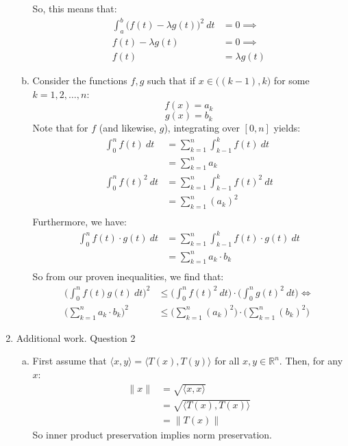 \documentclass[letterpaper,10pt]{article}
\begin{document}
\begin{enumerate}
\begin{enumerate}[a)]
		So, this means that:
		\begin{align*}
		  \int_{a}^{b} \big( f(t) - \lambda g(t) \big)^2 \ dt &= 0 \implies \\
		  f(t) - \lambda g(t) &= 0 \implies \\
		  f(t) &= \lambda g(t)
		\end{align*}
		\item Consider the functions $f, g$ such that if $x \in \big((k-1), k \big)$ for some $k = 1 , 2 , \dots , n$:
		$$f(x) = a_k$$
		$$g(x) = b_k$$
		Note that for $f$ (and likewise, $g$), integrating over $[0, n]$ yields:
		\begin{align*}
		  \int_{0}^{n} f(t) \ dt &= \sum_{k=1}^{n} \int_{k-1}^{k} f(t)\ dt \\
		  &= \sum_{k=1}^{n} a_k \\
		  \int_{0}^{n} f(t)^2 \ dt &= \sum_{k=1}^{n} \int_{k-1}^{k} f(t)^2\ dt \\
		  &= \sum_{k=1}^{n} (a_k)^2 \\
		\end{align*}
		Furthermore, we have:
		\begin{align*}
		  \int_{0}^{n} f(t)\cdot g(t) \ dt &= \sum_{k=1}^{n} \int_{k-1}^{k} f(t) \cdot g(t)\ dt \\
		  &= \sum_{k=1}^{n} a_k \cdot b_k\\
		\end{align*}
		So from our proven inequalities, we find that:
		\begin{align*}
		  \Bigg( \int_{0}^{n} f(t)g(t)\ dt \Bigg)^2 & \leq \Bigg( \int_{0}^{n} f(t)^2\ dt \Bigg) \cdot \Bigg( \int_{0}^{n} g(t)^2 \ dt \Bigg) \iff \\
		  \Bigg( \sum_{k=1}^{n} a_k \cdot b_k \Bigg)^2 & \leq \Bigg( \sum_{k=1}^{n} (a_k)^2  \Bigg) \cdot \Bigg( \sum_{k=1}^{n} (b_k)^2  \Bigg) 
		\end{align*}
	\end{enumerate}
	\item Additional work. Question 2
	\begin{enumerate}[a)]
		\item First assume that $\langle x, y \rangle = \langle T(x), T(y) \rangle$ for all $x, y \in \mathbb{R}^n$. Then, for any $x$:
		\begin{align*}
		  \|x\| & = \sqrt{\langle x, x \rangle} \\
		  & = \sqrt{\langle T(x), T(x) \rangle} \\
		  & = \|T(x)\| 
		\end{align*}
		So inner product preservation implies norm preservation.

\end{enumerate}
\end{enumerate}
\end{document}
